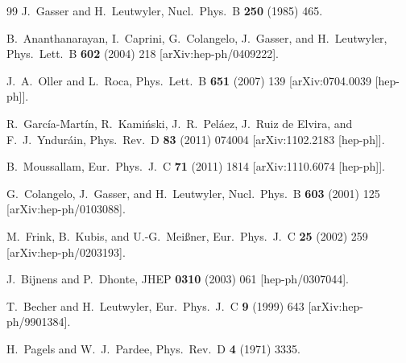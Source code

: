 \documentclass[11pt]{article}%
\begin{document}
\begin{thebibliography}{99}
  J.~Gasser and H.~Leutwyler,
  Nucl.\ Phys.\  B {\bf 250} (1985) 465.

  B.~Ananthanarayan, I.~Caprini, G.~Colangelo, J.~Gasser, and H.~Leutwyler,
  Phys.\ Lett.\  B {\bf 602} (2004) 218
  [arXiv:hep-ph/0409222].

  J.~A.~Oller and L.~Roca,
  Phys.\ Lett.\ B {\bf 651} (2007) 139
  [arXiv:0704.0039 [hep-ph]].

  R.~Garc\'ia-Mart\'in, R.~Kami\'nski, J.~R.~Pel\'aez, J.~Ruiz de Elvira, and F.~J.~Yndur\'ain,
  Phys.\ Rev.\  D {\bf 83} (2011)  074004
  [arXiv:1102.2183 [hep-ph]].

  B.~Moussallam,
  Eur.\ Phys.\ J.\  C {\bf 71} (2011) 1814
  [arXiv:1110.6074 [hep-ph]].

  G.~Colangelo, J.~Gasser, and H.~Leutwyler,
  Nucl.\ Phys.\  B {\bf 603} (2001) 125
  [arXiv:hep-ph/0103088].

  M.~Frink, B.~Kubis, and U.-G.~Mei{\ss}ner,
  Eur.\ Phys.\ J.\  C {\bf 25} (2002) 259
  [arXiv:hep-ph/0203193].

  J.~Bijnens and P.~Dhonte,
  JHEP {\bf 0310} (2003) 061
  [hep-ph/0307044].

  T.~Becher and H.~Leutwyler,
  Eur.\ Phys.\ J.\  C {\bf 9} (1999) 643
  [arXiv:hep-ph/9901384].

  H.~Pagels and W.~J.~Pardee,
  Phys.\ Rev.\ D {\bf 4} (1971) 3335.


\end{thebibliography}
\end{document}
